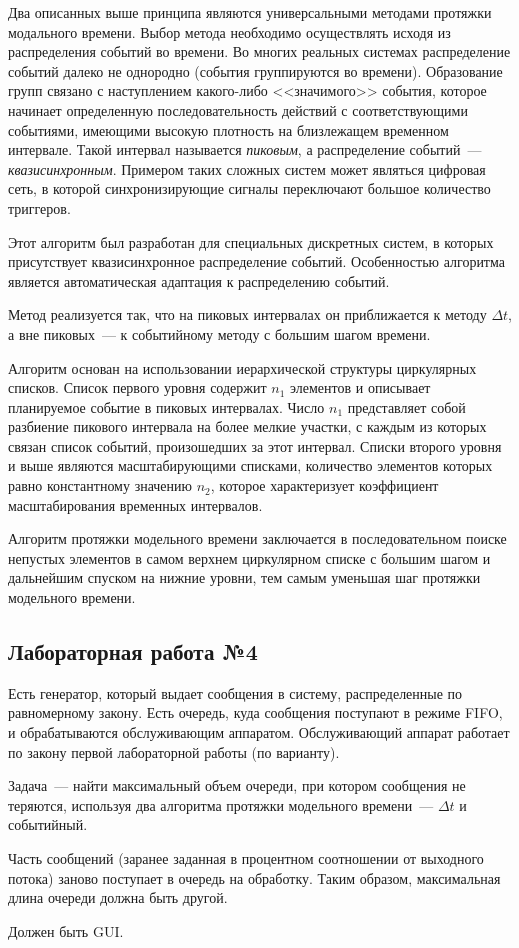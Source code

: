 Два описанных выше принципа являются универсальными методами протяжки модального времени. Выбор метода необходимо осуществлять исходя из распределения событий во времени. Во многих реальных системах распределение событий далеко не однородно (события группируются во времени). Образование групп связано с наступлением какого-либо <<значимого>> события, которое начинает определенную последовательность действий с соответствующими событиями, имеющими высокую плотность на близлежащем временном интервале. Такой интервал называется \textit{пиковым}, а распределение событий~--- \textit{квазисинхронным}. Примером таких сложных систем может являться цифровая сеть, в которой синхронизирующие сигналы переключают большое количество триггеров.

Этот алгоритм был разработан для специальных дискретных систем, в которых присутствует квазисинхронное распределение событий. Особенностью алгоритма является автоматическая адаптация к распределению событий.

Метод реализуется так, что на пиковых интервалах он приближается к методу $\Delta t$, а вне пиковых~--- к событийному методу с большим шагом времени.

Алгоритм основан на использовании иерархической структуры циркулярных списков. Список первого уровня содержит $n_1$ элементов и описывает планируемое событие в пиковых интервалах. Число $n_1$ представляет собой разбиение пикового интервала на более мелкие участки, с каждым из которых связан список событий, произошедших за этот интервал. Списки второго уровня и выше являются масштабирующими списками, количество элементов которых равно константному значению $n_2$, которое характеризует коэффициент масштабирования временных интервалов.

Алгоритм протяжки модельного времени заключается в последовательном поиске непустых элементов в самом верхнем циркулярном списке с большим шагом и дальнейшим спуском на нижние уровни, тем самым уменьшая шаг протяжки модельного времени.

\subsection{Лабораторная работа №4}

Есть генератор, который выдает сообщения в систему, распределенные по равномерному закону. Есть очередь, куда сообщения поступают в режиме FIFO, и обрабатываются обслуживающим аппаратом. Обслуживающий аппарат работает по закону первой лабораторной работы (по варианту).

Задача~--- найти максимальный объем очереди, при котором сообщения не теряются, используя два алгоритма протяжки модельного времени~--- $\Delta t$ и событийный.

Часть сообщений (заранее заданная в процентном соотношении от выходного потока) заново поступает в очередь на обработку. Таким образом, максимальная длина очереди должна быть другой.

Должен быть GUI.